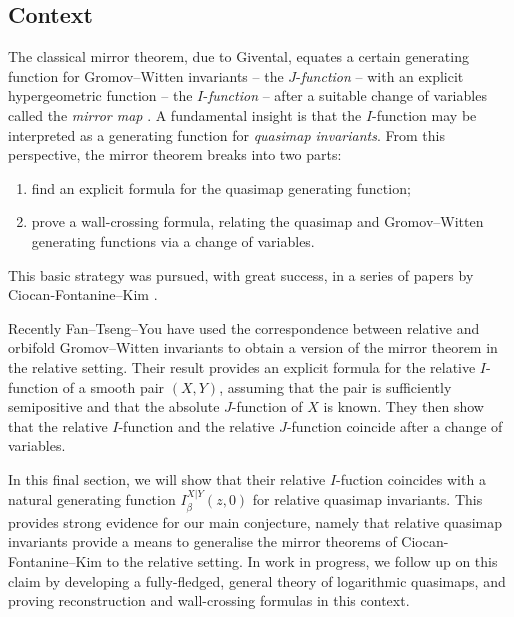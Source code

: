 \documentclass[10pt]{amsart}
\theoremstyle{definition}
\theoremstyle{definition}
\begin{document}
\subsection{Context}
The classical mirror theorem, due to Givental, equates a certain generating function for Gromov--Witten invariants -- the $J$-\emph{function} -- with an explicit hypergeometric function -- the $I$-\emph{function} -- after a suitable change of variables called the \emph{mirror map} \cite{Givental-mirror}. A fundamental insight is that the $I$-function may be interpreted as a generating function for \emph{quasimap invariants}. From this perspective, the mirror theorem breaks into two parts:
\begin{enumerate}
\item find an explicit formula for the quasimap generating function;
\item prove a wall-crossing formula, relating the quasimap and Gromov--Witten generating functions via a change of variables.
\end{enumerate}
This basic strategy was pursued, with great success, in a series of papers by Ciocan-Fontanine--Kim \cite{CFKBigI,CF-K-wallcrossing,CF-K-MirrorSymmetry}.

Recently \cite{FanTsengYou} Fan--Tseng--You have used the correspondence between relative and orbifold Gromov--Witten invariants \cite{AbramovichCadmanWise} to obtain a version of the mirror theorem in the relative setting. Their result \cite[Theorem 4.3]{FanTsengYou} provides an explicit formula for the relative $I$-function of a smooth pair $(X,Y)$, assuming that the pair is sufficiently semipositive and that the absolute $J$-function of $X$ is known. They then show that the relative $I$-function and the relative $J$-function coincide after a change of variables.

In this final section, we will show that their relative $I$-fuction coincides with a natural generating function $I_\beta^{X|Y}(z,0)$ for relative quasimap invariants. This provides strong evidence for our main conjecture, namely that relative quasimap invariants provide a means to generalise the mirror theorems of Ciocan-Fontanine--Kim to the relative setting. In work in progress, we follow up on this claim by developing a fully-fledged, general theory of logarithmic quasimaps, and proving reconstruction and wall-crossing formulas in this context.
\end{document}
